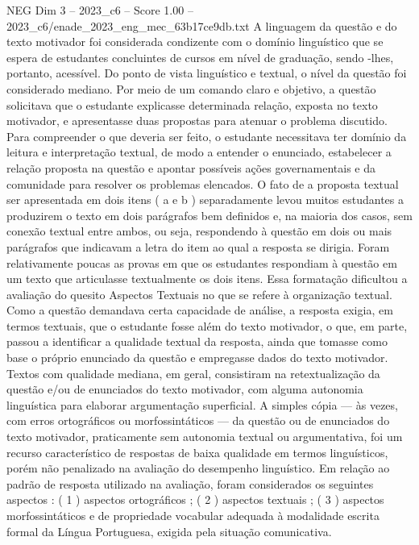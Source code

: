 \begin{textsample}{NEG Dim 3 – 2023\_c6 – Score 1.00 – 2023\_c6/enade\_2023\_eng\_mec\_63b17ce9db.txt}
A linguagem da questão e do texto motivador foi considerada condizente com o domínio linguístico que se espera de estudantes concluintes de cursos em nível de graduação, sendo -lhes, portanto, acessível.
Do ponto de vista linguístico e textual, o nível da questão foi considerado mediano.
Por meio de um comando claro e objetivo, a questão solicitava que o estudante explicasse determinada relação, exposta no texto motivador, e apresentasse duas propostas para atenuar o problema discutido.
Para compreender o que deveria ser feito, o estudante necessitava ter domínio da leitura e interpretação textual, de modo a entender o enunciado, estabelecer a relação proposta na questão e apontar possíveis ações governamentais e da comunidade para resolver os problemas elencados.
O fato de a proposta textual ser apresentada em dois itens ( a e b ) separadamente levou muitos estudantes a produzirem o texto em dois parágrafos bem definidos e, na maioria dos casos, sem conexão textual entre ambos, ou seja, respondendo à questão em dois ou mais parágrafos que indicavam a letra do item ao qual a resposta se dirigia.
Foram relativamente poucas as provas em que os estudantes respondiam à questão em um texto que articulasse textualmente os dois itens.
Essa formatação dificultou a avaliação do quesito Aspectos Textuais no que se refere à organização textual.
Como a questão demandava certa capacidade de análise, a resposta exigia, em termos textuais, que o estudante fosse além do texto motivador, o que, em parte, passou a identificar a qualidade textual da resposta, ainda que tomasse como base o próprio enunciado da questão e empregasse dados do texto motivador.
Textos com qualidade mediana, em geral, consistiram na retextualização da questão e/ou de enunciados do texto motivador, com alguma autonomia linguística para elaborar argumentação superficial.
A simples cópia — às vezes, com erros ortográficos ou morfossintáticos — da questão ou de enunciados do texto motivador, praticamente sem autonomia textual ou argumentativa, foi um recurso característico de respostas de baixa qualidade em termos linguísticos, porém não penalizado na avaliação do desempenho linguístico.
Em relação ao padrão de resposta utilizado na avaliação, foram considerados os seguintes aspectos : ( 1 ) aspectos ortográficos ; ( 2 ) aspectos textuais ; ( 3 ) aspectos morfossintáticos e de propriedade vocabular adequada à modalidade escrita formal da Língua Portuguesa, exigida pela situação comunicativa.

\end{textsample}
